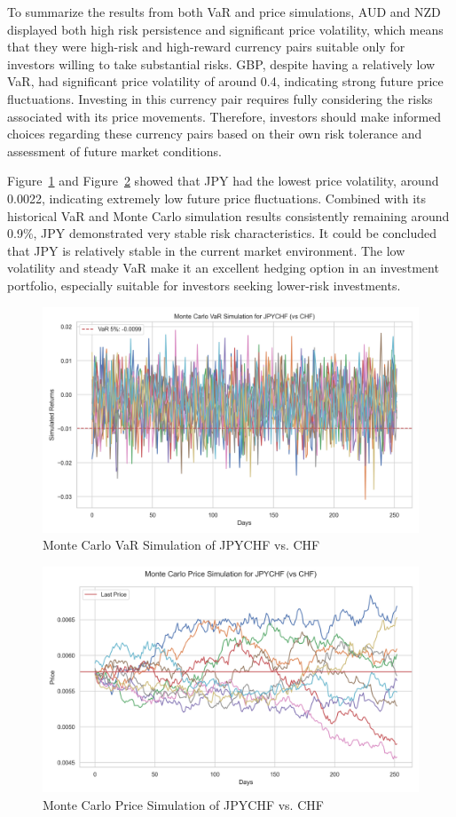 \documentclass{article}
\begin{document}
To summarize the results from both VaR and price simulations, AUD and NZD displayed both high risk persistence and significant price volatility, which means that they were high-risk and high-reward currency pairs suitable only for investors willing to take substantial risks. GBP, despite having a relatively low VaR, had significant price volatility of around 0.4, indicating strong future price fluctuations. Investing in this currency pair requires fully considering the risks associated with its price movements. Therefore, investors should make informed choices regarding these currency pairs based on their own risk tolerance and assessment of future market conditions.

Figure~\ref{fig:monte_carlo_var_simulation_JPYCHF_vs_CHF} and Figure~\ref{fig:monte_carlo_price_simulation_JPYCHF_vs_CHF} showed that JPY had the lowest price volatility, around 0.0022, indicating extremely low future price fluctuations. Combined with its historical VaR and Monte Carlo simulation results consistently remaining around 0.9\%, JPY demonstrated very stable risk characteristics. It could be concluded that JPY is relatively stable in the current market environment. The low volatility and steady VaR make it an excellent hedging option in an investment portfolio, especially suitable for investors seeking lower-risk investments.

\begin{figure}[H]
    \centering  \includegraphics[width=0.75\linewidth]{reports/figures/monte_carlo_var_simulation_JPYCHF_vs_CHF.png}
    \caption{Monte Carlo VaR Simulation of JPYCHF vs. CHF}   \label{fig:monte_carlo_var_simulation_JPYCHF_vs_CHF}
\end{figure}

\begin{figure}[H]
    \centering
    \includegraphics[width=0.75\linewidth]{reports/figures/monte_carlo_price_simulation_JPYCHF_vs_CHF.png}
    \caption{Monte Carlo Price Simulation of JPYCHF vs. CHF}  \label{fig:monte_carlo_price_simulation_JPYCHF_vs_CHF}
\end{figure}
\end{document}

